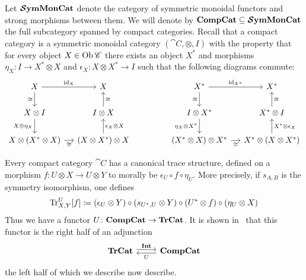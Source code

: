 \documentclass[12pt,oneside,article,draft]{memoir}
\begin{document}
Let $\bm{\mathcal{S}}\mathbf{ymMonCat}$ denote the category of symmetric monoidal functors and strong morphisms between them.
We will denote by $\mathbf{CompCat}\subseteq\bm{\mathcal{S}}\mathbf{ymMonCat}$ the full subcategory spanned by compact categories.
Recall that a compact category is a symmetric monoidal category $(\cat{C},\otimes,I)$ with the property that for every object $X\in\operatorname{Ob}\mathscr{C}$ there exists an object $X^*$ and morphisms $\eta_X\colon I\to X^*\otimes X$ and $\epsilon_X\colon X\otimes X^*\to I$ such that the following diagrams commute:
$$
	\begin{tikzcd}[column sep=small]
		X\arrow[r,"\id_X"]\arrow[d,"\cong"'] & X \\
		X\otimes I\arrow[d,"X\otimes\eta_X"'] & I\otimes X\arrow[u,"\cong"'] \\
		X\otimes(X^*\otimes X)\arrow[r,"\cong"'] & (X\otimes X^*)\otimes X\arrow[u,"\epsilon_X\otimes X"']
	\end{tikzcd}
	\hspace{.6in}
	\begin{tikzcd}[column sep=small]
		X^*\arrow[r,"\id_{X^*}"]\arrow[d,"\cong"'] & X^*\\
		I\otimes X^*\arrow[d,"\eta_X\otimes X^*"'] & X^*\otimes I\arrow[u,"\cong"'] \\
		(X^*\otimes X)\otimes X^*\arrow[r,"\cong"'] & X^*\otimes (X\otimes X^*)\arrow[u,"X^*\otimes\epsilon_X"']
	\end{tikzcd}
$$

Every compact category $\cat{C}$ has a canonical trace structure, defined on a morphism $f\colon U\otimes X\to U\otimes Y$ to morally be $\epsilon_U\circ f\circ \eta_U$.
More precisely, if $s_{A,B}$ is the symmetry isomorphism, one defines
	$$\operatorname{Tr}^U_{X,Y}[f]\coloneqq(\epsilon_U\otimes Y)\circ (s_{U^*,U}\otimes Y)\circ (U^*\otimes f)\circ (\eta_U\otimes X)$$
Thus we have a functor $U\colon\mathbf{CompCat}\to\mathbf{TrCat}$.
It is shown in~\cite{JoyalStreetVerity} that this functor is the right half of an adjunction
\begin{equation}\label{dia:traced compact adjunction}
\begin{tikzcd}
	\TrCat\arrow[r,shift left=.5ex, "\Int"]&\CompCat\arrow[l,shift left=.5ex,"U"]
\end{tikzcd}
\end{equation}
the left half of which we describe now describe.
\end{document}
